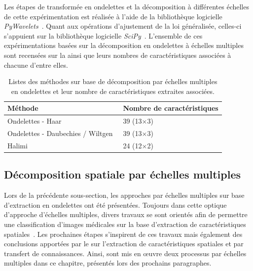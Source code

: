 Les étapes de transformée en ondelettes et la décomposition à différentes échelles de cette expérimentation est réalisée à l'aide de la bibliothèque logicielle \textit{PyWavelets}~\cite{lee2006}. Quant aux opérations d'ajustement de la loi généralisée, celles-ci s'appuient sur la bibliothèque logicielle \textit{SciPy}~\cite{Virtanen2020}. L'ensemble de ces expérimentations basées sur la décomposition en ondelettes à échelles multiples sont recensées sur la  ainsi que leurs nombres de caractéristiques associées à chacune d'entre elles.\par

\begin{table}[h]
    \centering
    \begin{tabular}{ll}
        \toprule
        \textbf{Méthode}                                    & \textbf{Nombre de caractéristiques}   \\ \hline
        Ondelettes - Haar                                   & 39 (13$\times$3)   \\ \hline
        Ondelettes - Daubechies / Wiltgen~\cite{Wiltgen2008}& 39 (13$\times$3)   \\ \hline
        Halimi~\cite{Halimi2017a}                           & 24 (12$\times$2)   \\
        \bottomrule
    \end{tabular}
    \caption{Listes des méthodes sur base de décomposition par échelles multiples en ondelettes et leur nombre de caractéristiques extraites associées.}
    \label{tab:wavelet_image_improvement_multiscale_nb_features}
\end{table}\par
\clearpage

\subsection{Décomposition spatiale par échelles multiples}
Lors de la précédente sous-section, les approches par échelles multiples sur base d'extraction en ondelettes ont été présentées. Toujours dans cette optique d'approche d'échelles multiples, divers travaux se sont orientés afin de permettre une classification d'images médicales sur la base d'extraction de caractéristiques spatiales~\cite{Alsaih2016,Tzalavra2016}. Les prochaines étapes s'inspirent de ces travaux mais également des conclusions apportées par le  sur l'extraction de caractéristiques spatiales et par transfert de connaissances. Ainsi, sont mis en œuvre deux processus par échelles multiples dans ce chapitre, présentés lors des prochains paragraphes.\par


